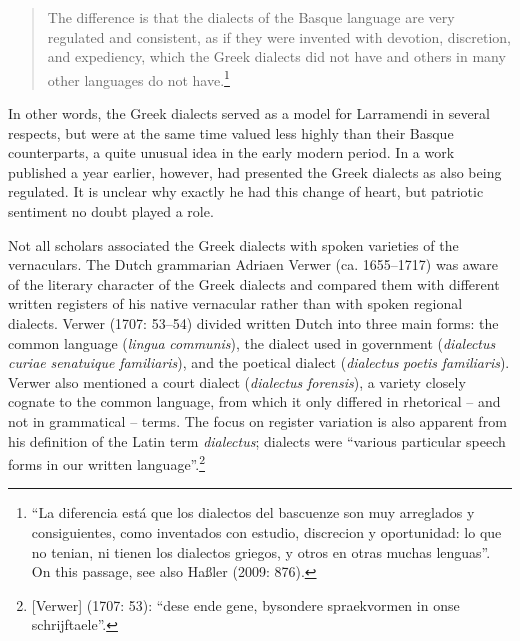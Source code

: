 \begin{quote}
The difference is that the dialects of the Basque language are very regulated and consistent, as if they were invented with devotion, discretion, and expediency, which the Greek dialects did not have and others in many other languages do not have.\footnote{“La diferencia está que los dialectos del bascuenze son muy arreglados y consiguientes, como inventados con estudio, discrecion y oportunidad: lo que no tenian, ni tienen los dialectos griegos, y otros en otras muchas lenguas”. On this passage, see also Haßler (2009: 876).}
\end{quote}

In other words, the Greek dialects served as a model for Larramendi in several respects, but were at the same time valued less highly than their Basque counterparts, a quite unusual idea in the early modern period. In a work published a year earlier, however, \citet[142]{Larramendi1728} had presented the Greek dialects as also being regulated. It is unclear why exactly he had this change of heart, but patriotic sentiment no doubt played a role.

Not all scholars associated the Greek dialects with spoken varieties of the vernaculars. The Dutch grammarian Adriaen Verwer (ca. 1655–1717) was aware of the literary character of the Greek dialects and compared them with different written registers of his native vernacular rather than with spoken regional dialects. Verwer (1707: 53–54) divided written Dutch into three main forms:  the common language (\textit{lingua} \textit{communis}),  the dialect used in government (\textit{dialectus} \textit{curiae} \textit{senatuique} \textit{familiaris}), and  the poetical dialect (\textit{dialectus} \textit{poetis} \textit{familiaris}). Verwer also mentioned a court dialect (\textit{dialectus} \textit{forensis}), a variety closely cognate to the common language, from which it only differed in rhetorical – and not in grammatical – terms. The focus on register variation is also apparent from his definition of the Latin term \textit{dialectus}; dialects were “various particular speech forms in our written language”.\footnote{[Verwer] (1707: 53): “dese ende gene, bysondere spraekvormen in onse schrijftaele”.}

